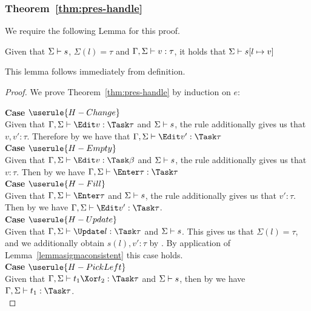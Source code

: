 \subsubsection{Theorem~\ref{thm:pres-handle}}

We require the following Lemma for this proof.

\begin{lemma}
  Given that $\Sigma\vdash s$, $\Sigma(l)=\tau$ and $\Gamma,\Sigma\vdash v:\tau$, it holds that $\Sigma\vdash s[l\mapsto v]$
  \label{lemmasigmaconsistent}
\end{lemma}
This lemma follows immediately from definition.

\begin{proof}
  We prove Theorem~\ref{thm:pres-handle} by induction on $e$:

  \noindent\textbf{Case} $\userule{H-Change}$\\
  \indent Given that
  $\Gamma,\Sigma\infers\Edit v:\Task\tau$ and $\Sigma\vdash s$, the
   rule additionally gives us that $v,v':\tau$. Therefore by
   we have that $\Gamma,\Sigma\infers\Edit v':\Task\tau$\\

  \noindent\textbf{Case} $\userule{H-Empty}$\\
  \indent  Given that
  $\Gamma,\Sigma\infers\Edit v:\Task\beta$ and $\Sigma\vdash s$, the
   rule additionally gives us that $v:\tau$. Then by
   we have $\Gamma,\Sigma\infers\Enter \tau:\Task\tau$ \\

  \noindent\textbf{Case} $\userule{H-Fill}$\\
  \indent  Given that
  $\Gamma,\Sigma\infers\Enter\tau$ and $\Sigma\vdash s$, the 
  rule additionally gives us that $v':\tau$. Then by  we have
  $\Gamma,\Sigma\infers \Edit v':\Task\tau$.\\

  \noindent\textbf{Case} $\userule{H-Update}$\\
  \indent  Given that
  $\Gamma,\Sigma\infers\Update l:\Task\tau$ and $\Sigma\vdash s$. This gives us
  that $\Sigma(l)=\tau$, and we additionally obtain $s(l),v':\tau$ by
  . By application of Lemma~\ref{lemmasigmaconsistent} this
  case holds.\\

  \noindent\textbf{Case} $\userule{H-PickLeft}$\\
  \indent  Given that
  $\Gamma,\Sigma\infers t_1\Xor t_2:\Task\tau$ and $\Sigma\vdash s$, then by
   we have $\Gamma,\Sigma\infers t_1:\Task \tau$.\\


\end{proof}
